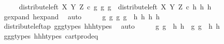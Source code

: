 \begin{isabellebody}
\ \ \isamarkupfalse%
\ \isamarkupfalse%
\ {\isachardoublequoteopen}distribute{\isacharunderscore}{\kern0pt}left\ X\ Y\ Z\ {\isasymcirc}\isactrlsub c\ {\isasymlangle}g{}{\isacharcomma}{\kern0pt}\ {\isasymlangle}g{}{\isacharcomma}{\kern0pt}\ g{}{\isasymrangle}{\isasymrangle}\ {\isacharequal}{\kern0pt}\ distribute{\isacharunderscore}{\kern0pt}left\ X\ Y\ Z\ {\isasymcirc}\isactrlsub c\ {\isasymlangle}h{}{\isacharcomma}{\kern0pt}\ {\isasymlangle}h{}{\isacharcomma}{\kern0pt}\ h{}{\isasymrangle}{\isasymrangle}{\isachardoublequoteclose}\isanewline
\ \ \ \ \isamarkupfalse%
\ g{\isacharunderscore}{\kern0pt}expand\ h{\isacharunderscore}{\kern0pt}expand\ \isamarkupfalse%
\ auto\isanewline
\ \ \isamarkupfalse%
\ \isamarkupfalse%
\ {\isachardoublequoteopen}{\isasymlangle}{\isasymlangle}g{}{\isacharcomma}{\kern0pt}\ g{}{\isasymrangle}{\isacharcomma}{\kern0pt}\ {\isasymlangle}g{}{\isacharcomma}{\kern0pt}\ g{}{\isasymrangle}{\isasymrangle}\ {\isacharequal}{\kern0pt}\ {\isasymlangle}{\isasymlangle}h{}{\isacharcomma}{\kern0pt}\ h{}{\isasymrangle}{\isacharcomma}{\kern0pt}\ {\isasymlangle}h{}{\isacharcomma}{\kern0pt}\ h{}{\isasymrangle}{\isasymrangle}{\isachardoublequoteclose}\isanewline
\ \ \ \ \isamarkupfalse%
\ distribute{\isacharunderscore}{\kern0pt}left{\isacharunderscore}{\kern0pt}ap\ g{}{\isacharunderscore}{\kern0pt}g{}{\isacharunderscore}{\kern0pt}g{}{\isacharunderscore}{\kern0pt}types\ h{}{\isacharunderscore}{\kern0pt}h{}{\isacharunderscore}{\kern0pt}h{}{\isacharunderscore}{\kern0pt}types\ \isamarkupfalse%
\ auto\isanewline
\ \ \isamarkupfalse%
\ \isamarkupfalse%
\ {\isachardoublequoteopen}{\isasymlangle}g{}{\isacharcomma}{\kern0pt}\ g{}{\isasymrangle}\ {\isacharequal}{\kern0pt}\ {\isasymlangle}h{}{\isacharcomma}{\kern0pt}\ h{}{\isasymrangle}\ {\isasymand}\ {\isasymlangle}g{}{\isacharcomma}{\kern0pt}\ g{}{\isasymrangle}\ {\isacharequal}{\kern0pt}\ {\isasymlangle}h{}{\isacharcomma}{\kern0pt}\ h{}{\isasymrangle}{\isachardoublequoteclose}\isanewline
\ \ \ \ \isamarkupfalse%
\ g{}{\isacharunderscore}{\kern0pt}g{}{\isacharunderscore}{\kern0pt}g{}{\isacharunderscore}{\kern0pt}types\ h{}{\isacharunderscore}{\kern0pt}h{}{\isacharunderscore}{\kern0pt}h{}{\isacharunderscore}{\kern0pt}types\ cart{\isacharunderscore}{\kern0pt}prod{\isacharunderscore}{\kern0pt}eq{}\ \isamarkupfalse%

\end{isabellebody}
